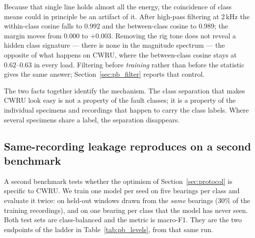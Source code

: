 \documentclass[journal]{IEEEtran}
\begin{document}
Because that single line holds almost all the energy, the coincidence of class
means could in principle be an artifact of it. After high-pass filtering at
2\,kHz the within-class cosine falls to $0.992$ and the between-class cosine to
$0.989$; the margin moves from $0.000$ to $+0.003$. Removing the rig tone does
not reveal a hidden class signature --- there is none in the magnitude
spectrum --- the opposite of what happens on CWRU, where the between-class
cosine stays at $0.62$--$0.63$ in every load. Filtering before \emph{training}
rather than before the statistic gives the same answer;
Section~\ref{sec:pb_filter} reports that control.

The two facts together identify the mechanism. The class separation that makes
CWRU look easy is not a property of the fault classes; it is a property of the
individual specimens and recordings that happen to carry the class labels. Where
several specimens share a label, the separation disappears.

\subsection{Same-recording leakage reproduces on a second benchmark}

A second benchmark tests whether the optimism of
Section~\ref{sec:protocol} is specific to CWRU. We train one model per seed on
five bearings per class and evaluate it twice: on held-out windows drawn from the \emph{same} bearings
($30\%$ of the training recordings), and on one bearing per class that the model
has never seen. Both test sets are class-balanced and the metric is macro-F1.
They are the two endpoints of the ladder in
Table~\ref{tab:pb_levels}, from that same run.

\begin{table}[t]
\centering
\caption{Same-recording versus bearing-disjoint evaluation on Paderborn
(condition N15\_M07\_F10, three classes, 5 training bearings per class, 200
epochs, ten seeds, macro-F1). The training set is files 1--4 of the training
bearings; the same-recording test set is its held-out $30\%$ of windows. All
ten runs are included, including the one that did not converge (see the text
below).}
\label{tab:pb_leak}
\small
{}
\end{table}
\end{document}
